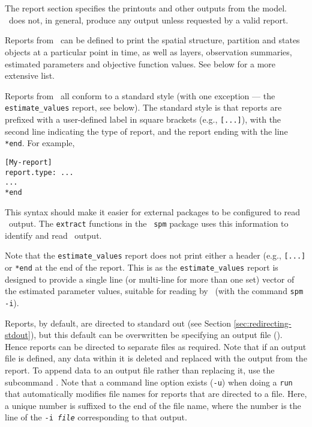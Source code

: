 \section{\label{sec:report-section}}

The report section specifies the printouts and other outputs from the model. \SPM\ does not, in general, produce any output unless requested by a valid report. 

Reports from \SPM\ can be defined to print the spatial structure, partition and states objects at a particular point in time, as well as layers, observation summaries, estimated parameters and objective function values. See below for a more extensive list.

Reports from \SPM\ all conform to a standard style (with one exception --- the \texttt{estimate\_values} report, see below). The standard style is that reports are prefixed with a user-defined label in square brackets (e.g., \texttt{[...]}), with the second line indicating the type of report, and the report ending with the line \texttt{*end}. For example,

\begin{verbatim} 
[My-report]
report.type: ...
...
*end
\end{verbatim}

This syntax should make it easier for external packages to be configured to read \SPM\ output. The \texttt{extract} functions in the \R\ \texttt{spm} package uses this information to identify and read \SPM\ output.

Note that the \texttt{estimate\_values} report does not print either a header (e.g., \texttt{[...]} or \texttt{*end} at the end of the report. This is as the \texttt{estimate\_values} report is designed to provide a single line (or multi-line for more than one set) vector of the estimated parameter values, suitable for reading by \SPM\ (with the command \texttt{spm -i}). 

Reports, by default, are directed to standard out (see Section \ref{sec:redirecting-stdout}), but this default can be overwritten be specifying an output file (). Hence reports can be directed to separate files as required. Note that if an output file is defined, any data within it is deleted and replaced with the output from the report. To append data to an output file rather than replacing it, use the subcommand . Note that a command line option exists (\texttt{-u}) when doing a \texttt{run} that automatically modifies file names for reports that are directed to a file. Here, a unique number is suffixed to the end of the file name, where the number is the line of the \texttt{-i \emph{file}} corresponding to that output. 

